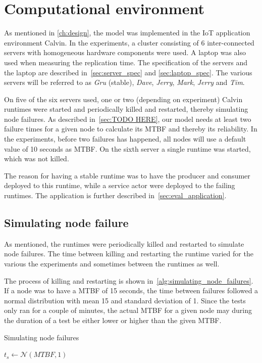 \documentclass{cslthse-msc}
\begin{document}
\section{Computational environment} \label{sec:eval_comp_env}
As mentioned in \cref{ch:design}, the model was implemented in the IoT application environment Calvin. In the experiments, a cluster consisting of 6 inter-connected servers with homogeneous hardware components were used. A laptop was also used when measuring the replication time. The specification of the servers and the laptop are described in~\cref{sec:server_spec} and \cref{sec:laptop_spec}. The various servers will be referred to as \emph{Gru} (stable), \emph{Dave}, \emph{Jerry}, \emph{Mark}, \emph{Jerry} and \emph{Tim}.

On five of the six servers used, one or two (depending on experiment) Calvin runtimes were started and periodically killed and restarted, thereby simulating node failures. As described in~\cref{sec:TODO HERE}, our model needs at least two failure times for a given node to calculate its MTBF and thereby its reliability. In the experiments, before two failures has happened, all nodes will use a default value of 10 seconds as MTBF. On the sixth server a single runtime was started, which was not killed.

The reason for having a stable runtime was to have the producer and consumer deployed to this runtime, while a service actor were deployed to the failing runtimes. The application is further described in~\cref{sec:eval_application}.

\subsection{Simulating node failure} \label{sec:simulating_node_failure}
As mentioned, the runtimes were periodically killed and restarted to simulate node failures. The time between killing and restarting the runtime varied for the various the experiments and sometimes between the runtimes as well. 

The process of killing and restarting is shown in~\cref{alg:simulating_node_failures}. If a node was to have a MTBF of 15 seconds, the time between failures followed a normal distribution with mean 15 and standard deviation of 1. Since the tests only ran for a couple of minutes, the actual MTBF for a given node  may during the duration of a test be either lower or higher than the given MTBF.

\begin{algorithm} 
	\caption{Simulating node failures} \label{alg:simulating_node_failures}
	\begin{algorithmic}[1]
		\State
		\State $t_{s}\gets \mathcal{N} (MTBF,1)$
		\State
		\State
	\EndWhile
	\end{algorithmic}
\end{algorithm}
\end{document}
